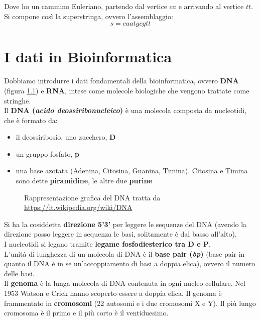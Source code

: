 \documentclass[a4paper,12pt, oneside]{book}
\begin{document}
\begin{esempio}
\begin{figure}[H]
  \end{figure}
  Dove ho un cammino Euleriano, partendo dal vertice $ca$ e arrivando al vertice
  $tt$. Si compone così la superstringa, ovvero l'assemblaggio: 
  \[s=caatgcgtt\]
\end{esempio}








\chapter{I dati in Bioinformatica}
Dobbiamo introdurre i dati fondamentali della bioinformatica, ovvero
\textbf{DNA} (figura \ref{fig:dna}) e \textbf{RNA}, intese come molecole
biologiche che vengono trattate come stringhe.\\
Il \textbf{DNA (\textit{acido deossiribonucleico})} è una molecola composta da
nucleotidi, che è formato da:
\begin{itemize}
  \item il deossiribosio, uno zucchero, \textbf{D}
  \item un gruppo fosfato, \textbf{p}
  \item una base azotata (Adenina, Citosina, Guanina, Timina). Citosina e Timina
  sono dette \textbf{piramidine}, le altre due \textbf{purine}
\end{itemize}
\begin{figure}
  \centering
  
  \caption{Rappresentazione grafica del
    DNA tratta da \url{https://it.wikipedia.org/wiki/DNA}} 
  \label{fig:dna}
\end{figure}
Si ha la cosiddetta \textbf{direzione 5'3'} per leggere le sequenze del DNA
(avendo la direzione posso leggere in sequenza le basi, solitamente è dal basso
all'alto).\\
I nucleotidi si legano tramite \textbf{legame fosfodiesterico tra D e P}. \\
L'unità di lunghezza di un molecola di DNA è il \textbf{base pair
  (\textit{bp})} (base pair in quanto il DNA è in se un'accoppiamento di basi a
doppia elica), ovvero il numero delle basi.\\
Il \textbf{genoma} è la lunga molecola di DNA contenuta in ogni nucleo
cellulare. Nel 1953 Watson e Crick hanno scoperto essere a doppia elica. Il
genoma è frammentato in \textbf{cromosomi} (22 autosomi e i due cromosomi X e
Y). Il più lungo cromosoma è il primo e il più corto è il ventiduesimo.\\
\end{document}
